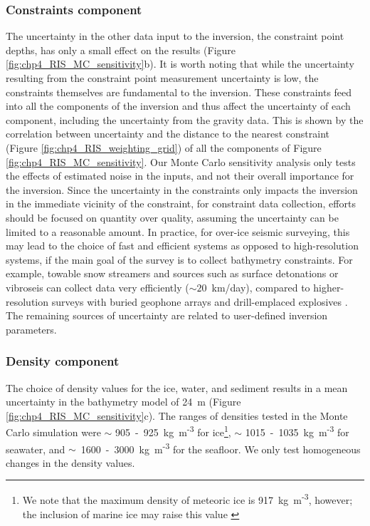 \subsubsection{Constraints component}
 The uncertainty in the other data input to the inversion, the constraint point depths, has only a small effect on the results (Figure \ref{fig:chp4_RIS_MC_sensitivity}b). It is worth noting that while the uncertainty resulting from the constraint point measurement uncertainty is low, the constraints themselves are fundamental to the inversion. These constraints feed into all the components of the inversion and thus affect the uncertainty of each component, including the uncertainty from the gravity data. This is shown by the correlation between uncertainty and the distance to the nearest constraint (Figure \ref{fig:chp4_RIS_weighting_grid}) of all the components of Figure \ref{fig:chp4_RIS_MC_sensitivity}. Our Monte Carlo sensitivity analysis only tests the effects of estimated noise in the inputs, and not their overall importance for the inversion. Since the uncertainty in the constraints only impacts the inversion in the immediate vicinity of the constraint, for constraint data collection, efforts should be focused on quantity over quality, assuming the uncertainty can be limited to a reasonable amount. In practice, for over-ice seismic surveying, this may lead to the choice of fast and efficient systems as opposed to high-resolution systems, if the main goal of the survey is to collect bathymetry constraints. For example, towable snow streamers and sources such as surface detonations or vibroseis \citep[e.g.,][]{hofstedeevidence2021, smithdetailed2020} can collect data very efficiently ($\sim20$~km/day), compared to higher-resolution surveys with buried geophone arrays and drill-emplaced explosives \citep[e.g.,][]{horgansediment2013}. The remaining sources of uncertainty are related to user-defined inversion parameters.\\

\subsubsection{Density component}
The choice of density values for the ice, water, and sediment results in a mean uncertainty in the bathymetry model of 24~m (Figure \ref{fig:chp4_RIS_MC_sensitivity}c). The ranges of densities tested in the Monte Carlo simulation were $\sim$ 905~-~925~kg~m\textsuperscript{-3} for ice\footnote{We note that the maximum density of meteoric ice is 917~kg~m\textsuperscript{-3}, however; the inclusion of marine ice may raise this value \citep{frickerdistribution2001}}, $\sim$ 1015~-~1035~kg~m\textsuperscript{-3} for seawater, and $\sim$~1600~-~3000~kg~m\textsuperscript{-3} for the seafloor. We only test homogeneous changes in the density values.\\

